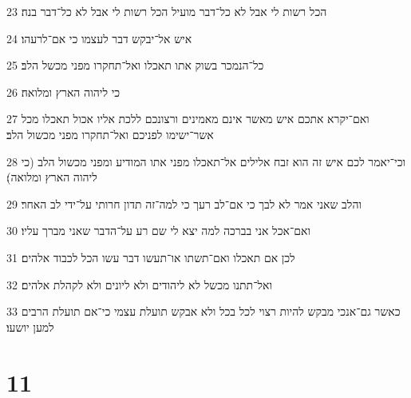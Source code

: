 \par 23 הכל רשות לי אבל לא כל־דבר מועיל הכל רשות לי אבל לא כל־דבר בנה׃
\par 24 איש אל־יבקש דבר לעצמו כי אם־לרעהו׃
\par 25 כל־הנמכר בשוק אתו תאכלו ואל־תחקרו מפני מכשל הלב׃
\par 26 כי ליהוה הארץ ומלואה׃
\par 27 ואם־יקרא אתכם איש מאשר אינם מאמינים ורצונכם ללכת אליו אכול תאכלו מכל אשר־ישימו לפניכם ואל־תחקרו מפני מכשול הלב׃
\par 28 וכי־יאמר לכם איש זה הוא זבח אלילים אל־תאכלו מפני אתו המודיע ומפני מכשול הלב (כי ליהוה הארץ ומלואה)׃
\par 29 והלב שאני אמר לא לבך כי אם־לב רעך כי למה־זה תדון חרותי על־ידי לב האחר׃
\par 30 ואם־אכל אני בברכה למה יצא לי שם רע על־הדבר שאני מברך עליו׃
\par 31 לכן אם תאכלו ואם־תשתו או־תעשו דבר עשו הכל לכבוד אלהים׃
\par 32 ואל־תתנו מכשל לא ליהודים ולא ליונים ולא לקהלת אלהים׃
\par 33 כאשר גם־אנכי מבקש להיות רצוי לכל בכל ולא אבקש תועלת עצמי כי־אם תועלת הרבים למען יושעו׃

\chapter{11}

